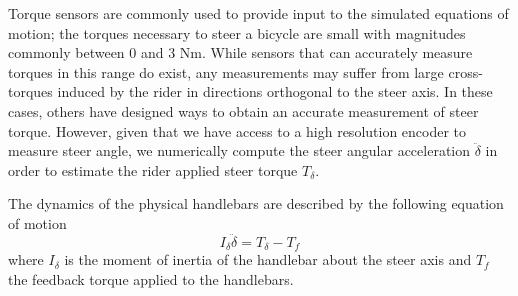\documentclass[11pt,a4paper,reqno]{amsart}
\newcommand{\steer}{\delta}
\begin{document}
Torque sensors are commonly used to provide input to the simulated equations of motion\cite{FIXME}; the torques
necessary to steer a bicycle are small with magnitudes commonly between 0 and 3 Nm\cite{moore2012}.
While sensors that can accurately measure torques in this range do exist, any measurements may suffer from large
cross-torques induced by the rider in directions orthogonal to the steer axis.
In these cases, others have designed ways to obtain an accurate measurement of steer torque\cite{moore2012}.
However, given that we have access to a high resolution encoder to measure steer angle, we numerically compute the steer
angular acceleration $ \ddot{\steer} $ in order to estimate the rider applied steer torque $ T_\steer $.

The dynamics of the physical handlebars are described by the following equation of motion
\begin{equation}
    I_\steer \ddot{\steer} = T_\steer- T_f
\end{equation}
where $ I_\steer $ is the moment of inertia of the handlebar about the steer axis and $ T_f $ the feedback torque
applied to the handlebars.
\end{document}
